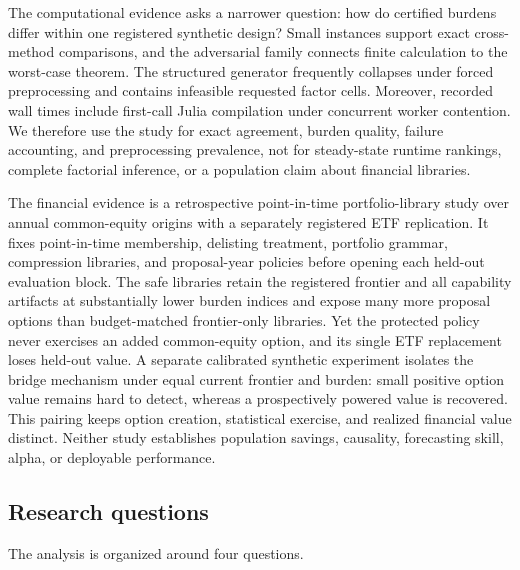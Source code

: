 The computational evidence asks a narrower question: how do certified burdens
differ within one registered synthetic design? Small instances support exact
cross-method comparisons, and the adversarial family connects finite
calculation to the worst-case theorem. The structured generator frequently
collapses under forced preprocessing and contains infeasible requested factor
cells. Moreover, recorded wall times include first-call Julia compilation
under concurrent worker contention. We therefore use the study for exact
agreement, burden quality, failure accounting, and preprocessing prevalence,
not for steady-state runtime rankings, complete factorial inference, or a
population claim about financial libraries.

The financial evidence is a retrospective point-in-time portfolio-library
study over annual common-equity origins with a separately registered ETF
replication. It fixes point-in-time membership, delisting treatment, portfolio
grammar, compression libraries, and proposal-year policies before opening each
held-out evaluation block. The safe libraries retain the registered frontier
and all capability artifacts at substantially lower burden indices and expose
many more proposal options than budget-matched frontier-only libraries. Yet
the protected policy never exercises an added common-equity option, and its
single ETF replacement loses held-out value. A separate calibrated synthetic
experiment isolates the bridge mechanism under equal current frontier and
burden: small positive option value remains hard to detect, whereas a
prospectively powered value is recovered. This pairing keeps option creation,
statistical exercise, and realized financial value distinct. Neither study
establishes population savings, causality, forecasting skill, alpha, or
deployable performance.

\subsection{Research questions}

The analysis is organized around four questions.

